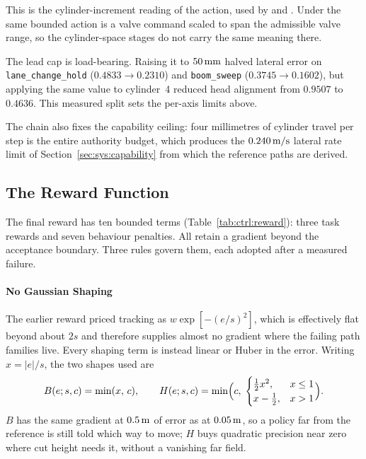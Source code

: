 This is the cylinder-increment reading of the action, used by \ppoROM{} and
\ppoIDFD{}. Under \ppoAAMFD{} the same bounded action is a valve command scaled
to span the admissible valve range, so the cylinder-space stages do not carry
the same meaning there.

The lead cap is load-bearing. Raising it to $\unit[50]{mm}$ halved lateral error
on \texttt{lane\_change\_hold} ($0.4833 \to 0.2310$) and
\texttt{boom\_sweep} ($0.3745 \to 0.1602$), but applying the same value to
cylinder~4 reduced head alignment from $0.9507$ to $0.4636$. This measured split
sets the per-axis limits above.

The chain also fixes the capability ceiling: four millimetres of cylinder travel
per step is the entire authority budget, which produces the
$\unit[0.240]{m/s}$ lateral rate limit of Section~\ref{sec:sys:capability} from
which the reference paths are derived.

\subsection{The Reward Function}

The final \ppoROM{} reward has ten bounded terms
(Table~\ref{tab:ctrl:reward}): three task rewards and seven behaviour penalties.
All retain a gradient beyond the acceptance boundary. Three rules govern them,
each adopted after a measured failure.

\paragraph{No Gaussian Shaping}
The earlier reward priced tracking as $w\exp[-(e/s)^2]$, which is effectively
flat beyond about $2s$ and therefore supplies almost no gradient where the
failing path families live. Every shaping term is instead linear or Huber in the
error. Writing $x = |e|/s$, the two shapes used are
%
\begin{equation}
  \label{eq:ctrl:shapes}
  B(e;s,c) = \min(x,\,c),
  \qquad
  H(e;s,c) = \min\Bigl(c,\;
  \begin{cases}
    \tfrac{1}{2}x^{2}, & x \le 1\\
    x - \tfrac{1}{2},  & x > 1
  \end{cases}\Bigr).
\end{equation}
%
$B$ has the same gradient at $\unit[0.5]{m}$ of error as at $\unit[0.05]{m}$,
so a policy far from the reference is still told which way to move; $H$ buys
quadratic precision near zero where cut height needs it, without a vanishing
far field.

